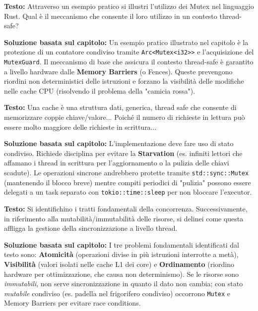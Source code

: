 \begin{exambox}
\textbf{Testo:} Attraverso un esempio pratico si illustri l'utilizzo dei Mutex nel linguaggio Rust. Qual è il meccanismo che consente il loro utilizzo in un contesto thread-safe?

\textbf{Soluzione basata sul capitolo:} Un esempio pratico illustrato nel capitolo è la protezione di un contatore condiviso tramite \texttt{Arc<Mutex<i32>>} e l'acquisizione del \texttt{MutexGuard}. Il meccanismo di base che assicura il contesto thread-safe è garantito a livello hardware dalle \textbf{Memory Barriers} (o Fences). Queste prevengono riordini non deterministici delle istruzioni e forzano la visibilità delle modifiche nelle cache CPU (risolvendo il problema della "camicia rossa").
\end{exambox}

\begin{exambox}
\textbf{Testo:} Una cache è una struttura dati, generica, thread safe che consente di memorizzare coppie chiave/valore... Poiché il numero di richieste in lettura può essere molto maggiore delle richieste in scrittura...

\textbf{Soluzione basata sul capitolo:} L'implementazione deve fare uso di stato condiviso. Richiede disciplina per evitare la \textbf{Starvation} (es. infiniti lettori che affamano i thread in scrittura per l'aggiornamento o la pulizia delle chiavi scadute). Le operazioni sincrone andrebbero protette tramite \texttt{std::sync::Mutex} (mantenendo il blocco breve) mentre compiti periodici di "pulizia" possono essere delegati a un task separato con \texttt{tokio::time::sleep} per non bloccare l'executor.
\end{exambox}

\begin{exambox}
\textbf{Testo:} Si identifichino i tratti fondamentali della concorrenza. Successivamente, in riferimento alla mutabilità/immutabilità delle risorse, si delinei come questa affligga la gestione della sincronizzazione a livello thread.

\textbf{Soluzione basata sul capitolo:} I tre problemi fondamentali identificati dal testo sono: \textbf{Atomicità} (operazioni divise in più istruzioni interrotte a metà), \textbf{Visibilità} (valori isolati nelle cache L1 dei core) e \textbf{Ordinamento} (riordino hardware per ottimizzazione, che causa non determinismo). Se le risorse sono \textit{immutabili}, non serve sincronizzazione in quanto il dato non cambia; con stato \textit{mutabile} condiviso (es. padella nel frigorifero condiviso) occorrono \texttt{Mutex} e Memory Barriers per evitare race conditions.
\end{exambox}

